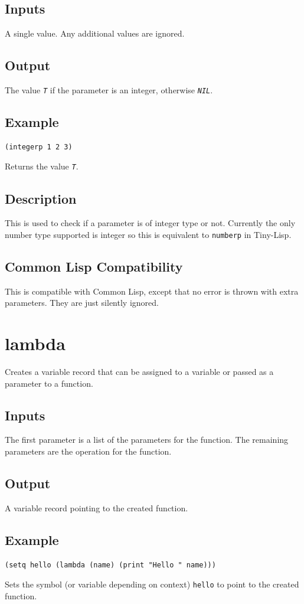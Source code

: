 \documentclass[10pt, openany]{book}
\newcommand{\constant}[1]{\emph{\texttt{#1}}}
\newcommand{\keyword}[1]{\texttt{#1}}
\newcommand{\tl}{Tiny-Lisp}
\newcommand{\cl}{Common Lisp}
\begin{document}
\subsection{Inputs}
A single value.  Any additional values are ignored.
\subsection{Output}
The value \constant{T} if the parameter is an integer, otherwise \constant{NIL}.
\subsection{Example}
\begin{lstlisting}
(integerp 1 2 3)
\end{lstlisting}
Returns the value \constant{T}.
\subsection{Description}
This is used to check if a parameter is of integer type or not.  Currently the only number type supported is integer so this is equivalent to \keyword{numberp} in \tl.
\subsection{Common Lisp Compatibility}
This is compatible with \cl, except that no error is thrown with extra parameters.  They are just silently ignored.

\section{lambda}
Creates a variable record that can be assigned to a variable or passed as a parameter to a function.
\subsection{Inputs}
The first parameter is a list of the parameters for the function.  The remaining parameters are the operation for the function.
\subsection{Output}
A variable record pointing to the created function.
\subsection{Example}
\begin{lstlisting}
(setq hello (lambda (name) (print "Hello " name)))
\end{lstlisting}
Sets the symbol (or variable depending on context) \keyword{hello} to point to the created function.
\end{document}

